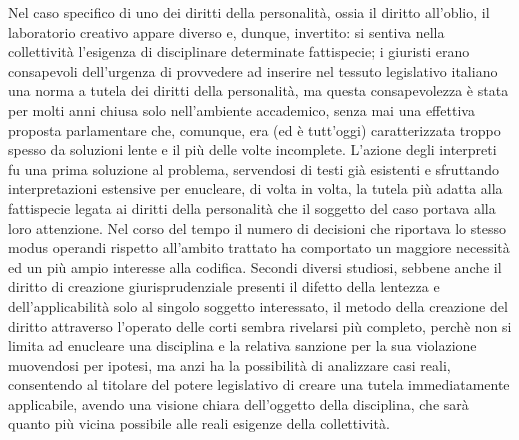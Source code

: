 Nel caso specifico di uno dei diritti della personalità, ossia il diritto all’oblio, il laboratorio creativo appare diverso e, dunque, invertito: si sentiva nella collettività l'esigenza di disciplinare determinate fattispecie; i giuristi erano consapevoli dell'urgenza di provvedere ad inserire nel tessuto legislativo italiano una norma a tutela dei diritti della personalità, ma questa consapevolezza è stata per molti anni chiusa solo nell'ambiente accademico, senza mai una effettiva proposta parlamentare che, comunque, era (ed è tutt'oggi) caratterizzata troppo spesso da soluzioni lente e il più delle volte incomplete.
L'azione degli interpreti fu una prima soluzione al problema, servendosi di testi già esistenti e sfruttando interpretazioni estensive per enucleare, di volta in volta, la tutela più adatta alla fattispecie legata ai diritti della personalità che il soggetto del caso portava alla loro attenzione.
Nel corso del tempo il numero di decisioni che riportava lo stesso modus operandi rispetto all’ambito trattato ha comportato un maggiore necessità ed un più ampio interesse alla codifica.
Secondi diversi studiosi, sebbene anche il diritto di creazione giurisprudenziale presenti il difetto della  lentezza e dell'applicabilità solo al singolo soggetto interessato, il metodo della creazione del diritto attraverso l'operato delle corti sembra rivelarsi più completo, perchè non si limita ad enucleare una disciplina e la relativa sanzione per la sua violazione muovendosi per ipotesi, ma anzi ha la possibilità di analizzare casi reali, consentendo al titolare del potere legislativo di creare una tutela immediatamente applicabile, avendo una visione chiara dell'oggetto della disciplina, che sarà quanto più vicina possibile alle reali esigenze della collettività.

